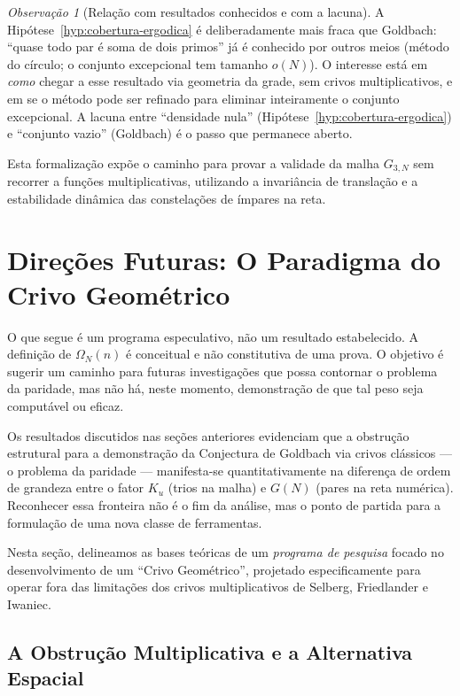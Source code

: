 \documentclass[12pt,a4paper]{article}
\theoremstyle{remark}
\newtheorem{remark}[theorem]{Observa\c{c}\~ao}
\begin{document}
	\begin{remark}[Rela\c{c}\~ao com resultados conhecidos e com a lacuna]
		A Hip\'otese~\ref{hyp:cobertura-ergodica} \'e deliberadamente mais fraca que Goldbach:
		``quase todo par \'e soma de dois primos'' j\'a \'e conhecido por outros meios
		(m\'etodo do c\'irculo; o conjunto excepcional tem tamanho $o(N)$).
		O interesse est\'a em \emph{como} chegar a esse resultado via geometria da grade,
		sem crivos multiplicativos, e em se o m\'etodo pode ser refinado para eliminar
		inteiramente o conjunto excepcional.
		A lacuna entre ``densidade nula'' (Hip\'otese~\ref{hyp:cobertura-ergodica}) e
		``conjunto vazio'' (Goldbach) \'e o passo que permanece aberto.
	\end{remark}
	
	Esta formaliza\c{c}\~ao exp\~oe o caminho para provar a validade da malha $G_{3,N}$
	sem recorrer a fun\c{c}\~oes multiplicativas, utilizando a invari\^ancia de
	transla\c{c}\~ao e a estabilidade din\^amica das constela\c{c}\~oes de \'impares na reta.
	
	\section{Direções Futuras: O Paradigma do Crivo Geométrico}
	\label{sec:crivo_geometrico}
	
	O que segue é um programa especulativo, não um resultado estabelecido. A definição de 
	$\Omega_N(n)$
	é conceitual e não constitutiva de uma prova. O objetivo é sugerir um caminho para futuras investigações que possa contornar o problema da paridade, mas não há, neste momento, demonstração de que tal peso seja computável ou eficaz.
	
	Os resultados discutidos nas seções anteriores evidenciam que a obstrução estrutural para a demonstração da Conjectura de Goldbach via crivos clássicos --- o problema da paridade --- manifesta-se quantitativamente na diferença de ordem de grandeza entre o fator $K_u$ (trios na malha) e $G(N)$ (pares na reta numérica). Reconhecer essa fronteira não é o fim da análise, mas o ponto de partida para a formulação de uma nova classe de ferramentas.
	
	Nesta seção, delineamos as bases teóricas de um \textit{programa de pesquisa} focado no desenvolvimento de um ``Crivo Geométrico'', projetado especificamente para operar fora das limitações dos crivos multiplicativos de Selberg, Friedlander e Iwaniec.
	
	\subsection{A Obstrução Multiplicativa e a Alternativa Espacial}
	
\end{document}
